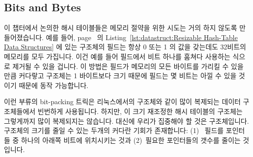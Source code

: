 \subsection{Bits and Bytes}
\label{sec:datastruct:Bits and Bytes}

이 챕터에서 논의한 해시 테이블들은 메모리 절약을 위한 시도는 거의 하지 않도록
만들어졌습니다.
예를 들어,
page~\pageref{lst:datastruct:Resizable Hash-Table Data Structures} 의
Listing~\ref{lst:datastruct:Resizable Hash-Table Data Structures} 에 있는
 구조체의  필드는 항상 0 또는 1 의 값을 갖는데도 32비트의
메모리를 모두 가집니다.
이건 예를 들어  필드에서 비트 하나를 훔쳐다 사용하는 식으로
제거될 수 있을 겁니다.
이 방법은  필드가 메모리의 모든 바이트를 가리킬 수 있을
만큼 커다랗고  구조체는 1 바이트보다 크기 때문에
 필드는 몇 비트는 아낄 수 있을 것이기 때문에 동작
가능합니다.

이런 부류의 bit-packing 트릭은 리눅스에서의  구조체와 같이 많이
복제되는 데이터 구조체들에서 빈번하게 사용됩니다.
하지만, 이 크기 재조정한 해시 테이블의  구조체는 그렇게까지 많이
복제되지는 않습니다.
대신에 우리가 집중해야 할 것은  구조체입니다.
 구조체의 크기를 줄일 수 있는 두개의 커다란 기회가 존재합니다:
(1)~ 필드를  포인터들 중 하나의 아래쪽 비트에
위치시키는 것과 (2)~필요한 포인터들의 갯수를 줄이는 것입니다.

